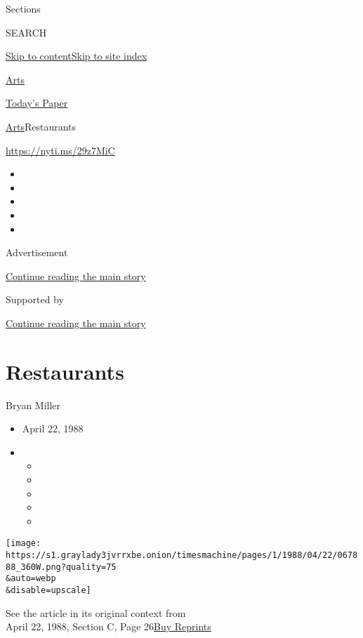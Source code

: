 Sections

SEARCH

\protect\hyperlink{site-content}{Skip to
content}\protect\hyperlink{site-index}{Skip to site index}

\href{https://www.nytimes3xbfgragh.onion/section/arts}{Arts}

\href{https://myaccount.nytimes3xbfgragh.onion/auth/login?response_type=cookie\&client_id=vi}{}

\href{https://www.nytimes3xbfgragh.onion/section/todayspaper}{Today's
Paper}

\href{/section/arts}{Arts}\textbar{}Restaurants

\url{https://nyti.ms/29z7MiC}

\begin{itemize}
\item
\item
\item
\item
\item
\end{itemize}

Advertisement

\protect\hyperlink{after-top}{Continue reading the main story}

Supported by

\protect\hyperlink{after-sponsor}{Continue reading the main story}

\hypertarget{restaurants}{%
\section{Restaurants}\label{restaurants}}

Bryan Miller

\begin{itemize}
\item
  April 22, 1988
\item
  \begin{itemize}
  \item
  \item
  \item
  \item
  \item
  \end{itemize}
\end{itemize}

\texttt{[image: https://s1.graylady3jvrrxbe.onion/timesmachine/pages/1/1988/04/22/067888\_360W.png?quality=75\\\&auto=webp\\\&disable=upscale]}

See the article in its original context from\\
April 22, 1988, Section C, Page
26\href{https://store.nytimes3xbfgragh.onion/collections/new-york-times-page-reprints?utm_source=nytimes\&utm_medium=article-page\&utm_campaign=reprints}{Buy
Reprints}

